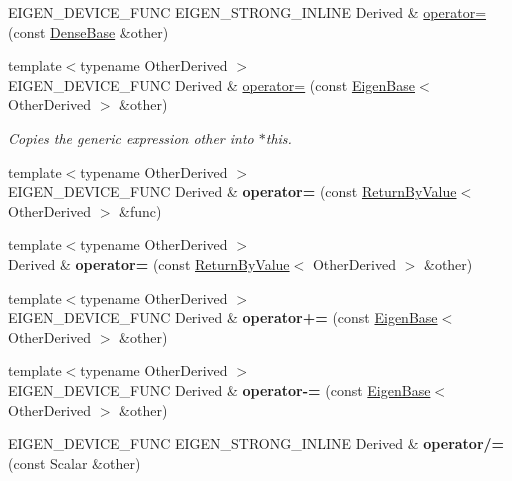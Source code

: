 \begin{DoxyCompactItemize}
E\+I\+G\+E\+N\+\_\+\+D\+E\+V\+I\+C\+E\+\_\+\+F\+U\+NC E\+I\+G\+E\+N\+\_\+\+S\+T\+R\+O\+N\+G\+\_\+\+I\+N\+L\+I\+NE Derived \& \mbox{\hyperlink{class_eigen_1_1_array_base_aae79d5d0d95e60bf2e64d0dc3dfd66a4}{operator=}} (const \mbox{\hyperlink{class_eigen_1_1_dense_base}{Dense\+Base}} \&other)
\item 
{\footnotesize template$<$typename Other\+Derived $>$ }\\E\+I\+G\+E\+N\+\_\+\+D\+E\+V\+I\+C\+E\+\_\+\+F\+U\+NC Derived \& \mbox{\hyperlink{class_eigen_1_1_array_base_a6462697d5a6fa3104f5f1213fdf9ff12}{operator=}} (const \mbox{\hyperlink{struct_eigen_1_1_eigen_base}{Eigen\+Base}}$<$ Other\+Derived $>$ \&other)
\begin{DoxyCompactList}\small\item\em Copies the generic expression {\itshape other} into $\ast$this. \end{DoxyCompactList}\item 
\mbox{\label{class_eigen_1_1_array_base_a5ab39bb4593a4321c3dc1d1cf7133c27}} 
{\footnotesize template$<$typename Other\+Derived $>$ }\\E\+I\+G\+E\+N\+\_\+\+D\+E\+V\+I\+C\+E\+\_\+\+F\+U\+NC Derived \& {\bfseries operator=} (const \mbox{\hyperlink{class_eigen_1_1_return_by_value}{Return\+By\+Value}}$<$ Other\+Derived $>$ \&func)
\item 
\mbox{\label{class_eigen_1_1_array_base_aa2875fc2c5e22a032cca855402b47f82}} 
{\footnotesize template$<$typename Other\+Derived $>$ }\\Derived \& {\bfseries operator=} (const \mbox{\hyperlink{class_eigen_1_1_return_by_value}{Return\+By\+Value}}$<$ Other\+Derived $>$ \&other)
\item 
\mbox{\label{class_eigen_1_1_array_base_a8fdd498a76ab5e136e3c55b1412cd8c4}} 
{\footnotesize template$<$typename Other\+Derived $>$ }\\E\+I\+G\+E\+N\+\_\+\+D\+E\+V\+I\+C\+E\+\_\+\+F\+U\+NC Derived \& {\bfseries operator+=} (const \mbox{\hyperlink{struct_eigen_1_1_eigen_base}{Eigen\+Base}}$<$ Other\+Derived $>$ \&other)
\item 
\mbox{\label{class_eigen_1_1_array_base_a5ce384b60166efd51356eb738f534144}} 
{\footnotesize template$<$typename Other\+Derived $>$ }\\E\+I\+G\+E\+N\+\_\+\+D\+E\+V\+I\+C\+E\+\_\+\+F\+U\+NC Derived \& {\bfseries operator-\/=} (const \mbox{\hyperlink{struct_eigen_1_1_eigen_base}{Eigen\+Base}}$<$ Other\+Derived $>$ \&other)
\item 
\mbox{\label{class_eigen_1_1_array_base_a7d10c42cfb8809d06310970ae7ae4331}} 
E\+I\+G\+E\+N\+\_\+\+D\+E\+V\+I\+C\+E\+\_\+\+F\+U\+NC E\+I\+G\+E\+N\+\_\+\+S\+T\+R\+O\+N\+G\+\_\+\+I\+N\+L\+I\+NE Derived \& {\bfseries operator/=} (const Scalar \&other)
\end{DoxyCompactItemize}
